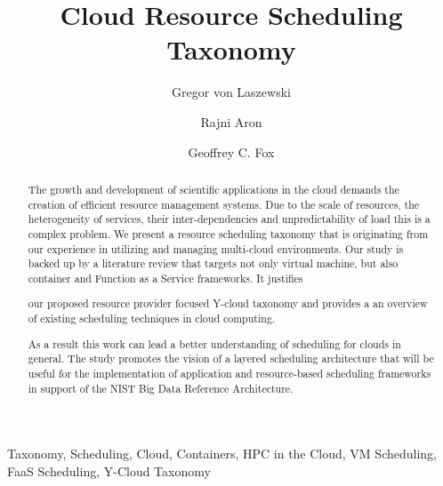 \documentclass[final,5p,times,twocolumn]{elsarticle}
\author[label1]{Gregor von Laszewski\corref{cor1}\fnref{label3}}
\author[label2]{Rajni Aron}
\author[label1]{Geoffrey C. Fox}
\newcommand{\TITLE}{Cloud Resource Scheduling Taxonomy }
\begin{document}
\onecolumn







\begin{frontmatter}
\title{\TITLE}

\maketitle



\begin{keyword}

  Taxonomy, Scheduling, Cloud, Containers, HPC in the Cloud,
  VM Scheduling, FaaS Scheduling, Y-Cloud Taxonomy

\end{keyword}

\begin{abstract}

  The growth and development of scientific applications in the cloud
  demands the creation of efficient resource management systems. Due
  to the scale of resources, the heterogeneity of services, their
  inter-dependencies and unpredictability of load this is a complex
  problem. We present a resource scheduling taxonomy that is
  originating from our experience in utilizing and managing
  multi-cloud environments.  Our study is backed up by a literature
  review that targets not only virtual machine, but also container and
  Function as a Service frameworks. It justifies

\color{red}

our proposed resource provider focused Y-cloud taxonomy and provides a an overview
of existing scheduling techniques in cloud computing.

\color{black}

As a result this
work can lead a better understanding of scheduling for clouds
in general. The study promotes the vision of a layered scheduling
architecture that will be useful for the implementation of application
and resource-based scheduling frameworks in support of the NIST Big
Data Reference Architecture.

\end{abstract}

\end{frontmatter}
\end{document}
